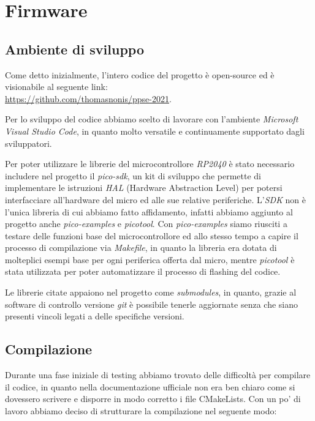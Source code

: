 \chapter{Firmware}

\hypertarget{ambiente-di-sviluppo}{%
\section{Ambiente di sviluppo}\label{ambiente-di-sviluppo}}

Come detto inizialmente, l'intero codice del progetto è open-source ed è
visionabile al seguente link:\\
\href{https://github.com/thomasnonis/ppse-2021}{\underline{https://github.com/thomasnonis/ppse-2021}}.

Per lo sviluppo del codice abbiamo scelto di lavorare con l'ambiente
\emph{Microsoft Visual Studio Code}, in quanto molto versatile e
continuamente supportato dagli sviluppatori.

Per poter utilizzare le librerie del microcontrollore \emph{RP2040} è
stato necessario includere nel progetto il \emph{pico-sdk}, un kit di
sviluppo che permette di implementare le istruzioni \emph{HAL} (Hardware
Abstraction Level) per potersi interfacciare all'hardware del micro ed
alle sue relative periferiche. L'\emph{SDK} non è l'unica libreria di
cui abbiamo fatto affidamento, infatti abbiamo aggiunto al progetto
anche \emph{pico-examples} e \emph{picotool}. Con \emph{pico-examples}
siamo riusciti a testare delle funzioni base del microcontrollore ed
allo stesso tempo a capire il processo di compilazione via
\emph{Makefile}, in quanto la libreria era dotata di molteplici esempi
base per ogni periferica offerta dal micro, mentre \emph{picotool} è
stata utilizzata per poter automatizzare il processo di flashing del
codice.

Le librerie citate appaiono nel progetto come \emph{submodules}, in
quanto, grazie al software di controllo versione \emph{git} è possibile
tenerle aggiornate senza che siano presenti vincoli legati a delle
specifiche versioni.

\hypertarget{compilazione}{%
\section{Compilazione}\label{compilazione}}

Durante una fase iniziale di testing abbiamo trovato delle difficoltà
per compilare il codice, in quanto nella documentazione ufficiale non
era ben chiaro come si dovessero scrivere e disporre in modo corretto i
file CMakeLists. Con un po' di lavoro abbiamo deciso di strutturare la
compilazione nel seguente modo:

